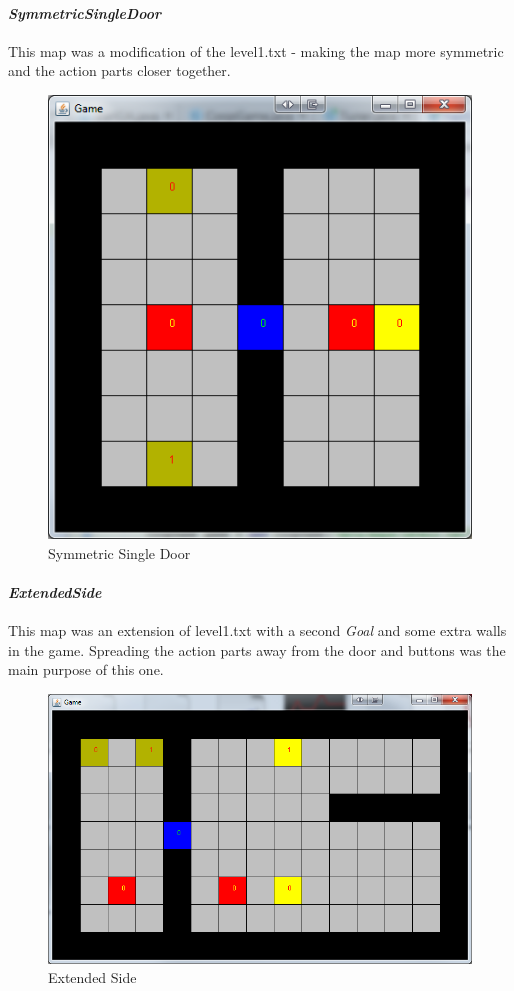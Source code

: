 \documentclass{IEEEtran}
\begin{document}
\paragraph{\emph{SymmetricSingleDoor}} This map was a modification of the level1.txt - making the map more symmetric and the action parts closer together.
\begin{figure}[H]
\centering
\includegraphics[scale=0.35]{level2}
\caption{Symmetric Single Door}
\label{SymmetricSingleDoor}
\end{figure}
\paragraph{\emph{ExtendedSide}} This map was an extension of level1.txt with a second \emph{Goal} and some extra walls in the game. Spreading the action parts away from the door and buttons was the main purpose of this one.
\begin{figure}[H]
\centering
\includegraphics[scale=0.35]{level3}
\caption{Extended Side}
\label{ExtendedSide}
\end{figure}
\end{document}
